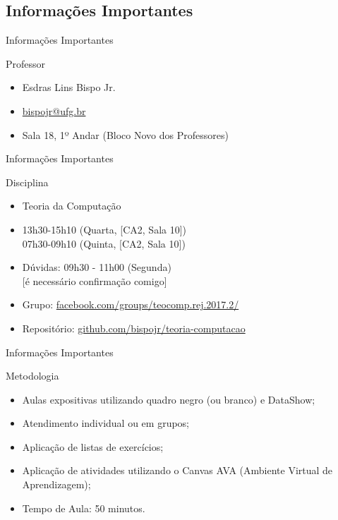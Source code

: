 \documentclass[xcolor=dvipsnames,table]{beamer}
\begin{document}
	\subsection{Informações Importantes}
	\begin{frame}{Informações Importantes}
		\begin{block}{Professor}
			\begin{itemize}
				\item Esdras Lins Bispo Jr.
				\item \url{bispojr@ufg.br}
				\item Sala 18, 1º Andar (Bloco Novo dos Professores)
			\end{itemize}
		\end{block}
	\end{frame}	
	
	\begin{frame}{Informações Importantes}
		\begin{block}{Disciplina}
			\begin{itemize}
				\item Teoria da Computação
				\item 13h30-15h10 (Quarta, [CA2, Sala 10])\\
					  07h30-09h10 (Quinta, [CA2, Sala 10])
				\item Dúvidas: 09h30 - 11h00 (Segunda)\\
					  {\color{red}[é necessário confirmação comigo]}
				\item Grupo: \url{facebook.com/groups/teocomp.rej.2017.2/}
				\item Repositório: \url{github.com/bispojr/teoria-computacao}
			\end{itemize}
		\end{block}
	\end{frame}
	
	\begin{frame}{Informações Importantes}
		\begin{block}{Metodologia}
			\begin{itemize}
				\item Aulas expositivas utilizando quadro negro (ou branco) e DataShow;
				\item Atendimento individual ou em grupos;
				\item Aplicação de listas de exercícios;
				\item Aplicação de atividades utilizando o 
				Canvas AVA (Ambiente Virtual de Aprendizagem);
				\item Tempo de Aula: 50 minutos.
			\end{itemize}
		\end{block}
	\end{frame}
	
\end{document}
